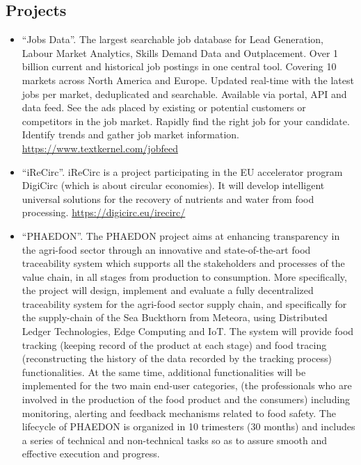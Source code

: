\documentclass[a4paper,oneside,10pt]{article}
\begin{document}
\subsection*{Projects}

\begin{itemize}

\item \begin{sloppypar}
``Jobs Data''. The largest searchable job database for Lead Generation, Labour Market Analytics, Skills Demand Data and Outplacement. Over 1 billion current and historical job postings in one central tool. Covering 10 markets across North America and Europe. Updated real-time with the latest jobs per market, deduplicated and searchable. Available via portal, API and data feed. See the ads placed by existing or potential customers or competitors in the job market. Rapidly find the right job for your candidate. Identify trends and gather job market information. \url{https://www.textkernel.com/jobfeed}

\end{sloppypar}

\item \begin{sloppypar}
``iReCirc''. iReCirc is a project participating in the EU accelerator program DigiCirc (which is about circular economies). It will develop intelligent universal solutions for the recovery of nutrients and water from food processing. \url{https://digicirc.eu/irecirc/}

\end{sloppypar}

\item \begin{sloppypar}
``PHAEDON''. The PHAEDON project aims at enhancing transparency in the agri-food sector through an innovative and state-of-the-art food traceability system which supports all the stakeholders and processes of the value chain, in all stages from production to consumption. More specifically, the project will design, implement and evaluate a fully decentralized traceability system for the agri-food sector supply chain, and specifically for the supply-chain of the Sea Buckthorn from Meteora, using Distributed Ledger Technologies, Edge Computing and IoT. The system will provide food tracking (keeping record of the product at each stage) and food tracing (reconstructing the history of the data recorded by the tracking process) functionalities. At the same time, additional functionalities will be implemented for the two main end-user categories, (the professionals who are involved in the production of the food product and the consumers) including monitoring, alerting and feedback mechanisms related to food safety. The lifecycle of PHAEDON is organized in 10 trimesters (30 months) and includes a series of technical and non-technical tasks so as to assure smooth and effective execution and progress.


\end{sloppypar}
\end{itemize}
\end{document}
